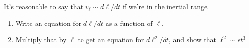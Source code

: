 
   It's reasonable to say that  $v_\ell \sim d\ell/dt$ if we're in the
      inertial range.
      \begin{enumerate}
          \item Write an equation for $d\ell/dt$ as a function of $\ell$.
          \item Multiply that by $\ell$ to get an equation for $d\ell^2/dt$, and
              show that $\ell^2 \sim \epsilon t^3$
      \end{enumerate}

